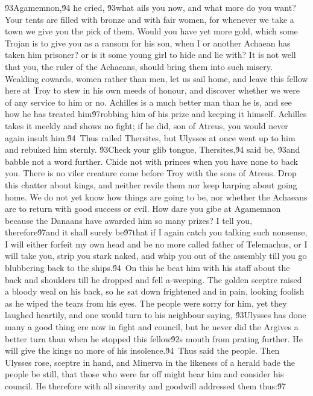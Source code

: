 {\'93Agamemnon,\'94 he cried, \'93what ails you now, and what more do you want? Your tents are filled with bronze and with fair women, for whenever we take a town we give you the pick of them. Would you have yet more gold, which some Trojan is to give you as a ransom for his son, when I or another Achaean has taken him prisoner? or is it some young girl to hide and lie with? It is not well that you, the ruler of the Achaeans, should bring them into such misery. Weakling cowards, women rather than men, let us sail home, and leave this fellow here at Troy to stew in his own meeds of honour, and discover whether we were of any service to him or no. Achilles is a much better man than he is, and see how he has treated him\'97robbing him of his prize and keeping it himself. Achilles takes it meekly and shows no fight; if he did, son of Atreus, you would never again insult him.\'94\
Thus railed Thersites, but Ulysses at once went up to him and rebuked him sternly. \'93Check your glib tongue, Thersites,\'94 said be, \'93and babble not a word further. Chide not with princes when you have none to back you. There is no viler creature come before Troy with the sons of Atreus. Drop this chatter about kings, and neither revile them nor keep harping about going home. We do not yet know how things are going to be, nor whether the Achaeans are to return with good success or evil. How dare you gibe at Agamemnon because the Danaans have awarded him so many prizes? I tell you, therefore\'97and it shall surely be\'97that if I again catch you talking such nonsense, I will either forfeit my own head and be no more called father of Telemachus, or I will take you, strip you stark naked, and whip you out of the assembly till you go blubbering back to the ships.\'94\
On this he beat him with his staff about the back and shoulders till he dropped and fell a-weeping. The golden sceptre raised a bloody weal on his back, so he sat down frightened and in pain, looking foolish as he wiped the tears from his eyes. The people were sorry for him, yet they laughed heartily, and one would turn to his neighbour saying, \'93Ulysses has done many a good thing ere now in fight and council, but he never did the Argives a better turn than when he stopped this fellow\'92s mouth from prating further. He will give the kings no more of his insolence.\'94\
Thus said the people. Then Ulysses rose, sceptre in hand, and Minerva in the likeness of a herald bade the people be still, that those who were far off might hear him and consider his council. He therefore with all sincerity and goodwill addressed them thus:\'97\
}
